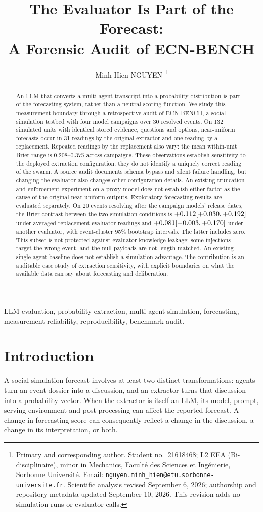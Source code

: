 \documentclass[10pt,conference]{IEEEtran}
\title{The Evaluator Is Part of the Forecast:\\A Forensic Audit of ECN-BENCH}
\author{\IEEEauthorblockN{Minh Hien NGUYEN}
\IEEEauthorblockA{L2 EEA (Bi-disciplinaire), minor in Mechanics\\
Facult\'e des Sciences et Ing\'enierie, Sorbonne Universit\'e\\
Student no.~21618468; \texttt{nguyen.minh\_hien@etu.sorbonne-universite.fr}}}
\author{Minh Hien NGUYEN%
\thanks{Primary and corresponding author. Student no.~21618468; L2 EEA
(Bi-disciplinaire), minor in Mechanics, Facult\'e des Sciences et Ing\'enierie,
Sorbonne Universit\'e. Email: \texttt{nguyen.minh\_hien@etu.sorbonne-universite.fr}.
Scientific analysis revised September 6, 2026; authorship and repository metadata updated
September 10, 2026. This revision adds no simulation runs or evaluator calls.}}
\begin{document}
\maketitle

\begin{abstract}
An LLM that converts a multi-agent transcript into a probability distribution
is part of the forecasting system, rather than a neutral scoring function.
We study this measurement boundary through a retrospective audit of ECN-BENCH,
a social-simulation testbed with four model campaigns over 30 resolved events.
On 132 simulated units with identical stored evidence, questions and options,
near-uniform forecasts occur in 31 readings by the original extractor and one
reading by a replacement. Repeated readings by the replacement also vary:
the mean within-unit Brier range is 0.208--0.375 across campaigns.
These observations establish sensitivity to the deployed extraction configuration;
they do not identify a uniquely correct reading of the swarm.
A source audit documents schema bypass and silent failure handling, but changing
the evaluator also changes other configuration details. An existing truncation
and enforcement experiment on a proxy model does not establish either factor
as the cause of the original near-uniform outputs.
Exploratory forecasting results are evaluated separately. On 20 events resolving
after the campaign models' release dates, the Brier contrast between the two
simulation conditions is $+0.112 [+0.030, +0.192]$ under averaged replacement-evaluator
readings and $+0.081 [-0.003, +0.170]$ under another evaluator, with event-cluster
95\% bootstrap intervals. The latter includes zero. This subset is not protected
against evaluator knowledge leakage; some injections target the wrong event,
and the null payloads are not length-matched. An existing single-agent baseline
does not establish a simulation advantage. The contribution is an auditable
case study of extraction sensitivity, with explicit boundaries on what the
available data can say about forecasting and deliberation.
\end{abstract}
\begin{IEEEkeywords}
LLM evaluation, probability extraction, multi-agent simulation, forecasting,
measurement reliability, reproducibility, benchmark audit.
\end{IEEEkeywords}

\section{Introduction}
\label{sec:intro}
A social-simulation forecast involves at least two distinct transformations:
agents turn an event dossier into a discussion, and an extractor turns that
discussion into a probability vector. When the extractor is itself an LLM,
its model, prompt, serving environment and post-processing can affect the
reported forecast. A change in forecasting score can consequently reflect a
change in the discussion, a change in its interpretation, or both.
\end{document}
